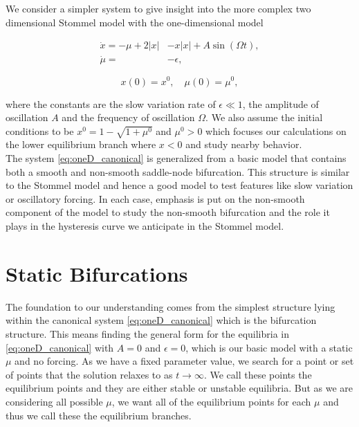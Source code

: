 We consider a simpler system to give insight into the more complex two dimensional Stommel model with the one-dimensional model

\begin{equation}\label{eq:oneD_canonical}
\begin{aligned}
\dot{x}=-\mu+2|x|&-x|x|+A\sin(\Omega t),\\
\dot{\mu}=&-\epsilon,
\end{aligned}
\end{equation}

\begin{equation*}
x(0)=x^0,\quad\mu(0)=\mu^0,
\end{equation*}

where the constants are the slow variation rate of $\epsilon \ll 1$, the amplitude of oscillation $A$ and the frequency of oscillation $\Omega$. We also assume the initial conditions to be ${x^0=1-\sqrt{1+\mu^0}}$ and $\mu^0>0$ which focuses our calculations on the lower equilibrium branch where $x<0$ and study nearby behavior.\\
The system \eqref{eq:oneD_canonical} is generalized from a basic model that contains both a smooth and non-smooth saddle-node bifurcation. This structure is similar to the Stommel model and hence a good model to test features like slow variation or oscillatory forcing. In each case, emphasis is put on the non-smooth component of the model to study the non-smooth bifurcation and the role it plays in the hysteresis curve we anticipate in the Stommel model.

\section{Static Bifurcations}
\label{sec:oneD_static}

The foundation to our understanding comes from the simplest structure lying within the canonical system \eqref{eq:oneD_canonical} which is the bifurcation structure. This means finding the general form for the equilibria in \eqref{eq:oneD_canonical} with $A=0$ and $\epsilon=0$, which is our basic model with a static $\mu$ and no forcing. As we have a fixed parameter value, we search for a point or set of points that the solution relaxes to as $t\to \infty$. We call these points the equilibrium points and they are either stable or unstable equilibria. But as we are considering all possible $\mu$, we want all of the equilibrium points for each $\mu$ and thus we call these the equilibrium branches.

